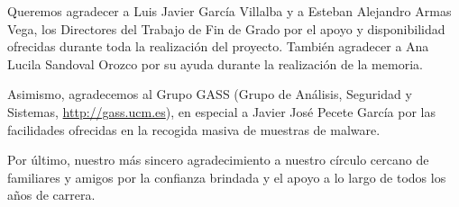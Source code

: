 
Queremos agradecer a Luis Javier García Villalba y a Esteban Alejandro Armas Vega, los Directores del Trabajo de Fin de Grado por el apoyo y disponibilidad ofrecidas durante toda la realización del proyecto. También agradecer a Ana Lucila Sandoval Orozco por su ayuda durante la realización de la memoria.

Asimismo, agradecemos al Grupo GASS (Grupo de Análisis, Seguridad y Sistemas, \url{http://gass.ucm.es}), en especial a Javier José Pecete García por las facilidades ofrecidas en la recogida masiva de muestras de malware.

Por último, nuestro más sincero agradecimiento a nuestro círculo cercano de familiares y amigos por la confianza brindada y el apoyo a lo largo de todos los años de carrera.

